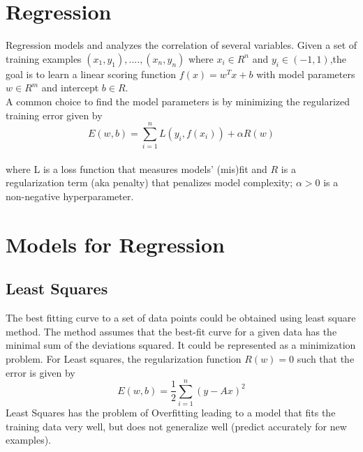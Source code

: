 \documentclass{sigplanconf}
\begin{document}
\section{Regression}
\noindent
Regression models and analyzes the correlation of several variables. Given a set of training examples 
\begin{math}(x_1,y_1),....,(x_n,y_n)\end{math} where \begin{math} x_i \in R^n \end{math}
and \begin{math} y_i \in (-1,1) \end{math},the goal is to learn a linear scoring function
\begin{math} f(x) = w^Tx + b \end{math} with model parameters \begin{math} w \in R^m \end{math}
and intercept \begin{math} b \in R. \end{math}\\

\noindent
A common choice to find the model parameters is by minimizing the regularized training error given by\\
\begin{equation} E(w,b) = \sum_{i=1}^{n} L(y_i,f(x_i)) + \alpha R(w) \end{equation} \\
where L is a loss function that measures models' (mis)fit and \begin{math}R\end{math} is a
regularization term (aka penalty) that penalizes model complexity; \begin{math}\alpha>0\end{math}
is a non-negative hyperparameter.

\section{Models for Regression}
\subsection{Least Squares}
The best fitting curve to a set of data points could be obtained using least square method. The method
assumes that the best-fit curve for a given data has the minimal sum of the deviations squared. It could
be represented as a minimization problem. For Least squares, the regularization function \begin{math}R(w)=0\end{math}
such that the error is given by \\
\begin{equation} E(w,b) =\frac{1}{2} \sum_{i=1}^{n} (y-Ax)^2\end{equation}
Least Squares has the problem of Overfitting leading to a model that fits the training data very well, but does not generalize well (predict accurately for new examples).
\end{document}
